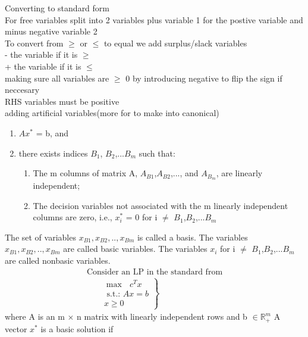 \documentclass{article}
\begin{document}
Converting to standard form\\
For free variables split into 2 variables plus variable 1 for the postive variable and minus negative variable 2\\
To convert from $\geq$ or $\leq$ to equal we add surplus/slack variables\\
- the variable if it is $\geq$\\
+ the variable if it is $\leq$\\
making sure all variables are $\geq$ 0 by introducing negative to flip the sign if neccesary\\
RHS variables must be positive\\
adding artificial variables(more for to make into canonical)\\

\begin{enumerate}
  \item $A x^*$ = b, and
  \item there exists indices $B_1$, $B_2$,...$B_m$ such that:
  \begin{enumerate}
    \item  The m columns of matrix A, $A_{B1}$,$A_{B2}$,..., and $A_{B_m}$, are linearly independent;
    \item  The decision variables not associated with the m linearly independent columns are zero, i.e., $x_i^*$ = 0 for i $\neq$ $B_1$,$B_2$,...$B_m$
  \end {enumerate}
\end{enumerate}
The set of variables {$x_{B1},x_{B2},..,x_{Bm}$} is called a
basis. The variables $x_{B1},x_{B2},..,x_{Bm}$ are called basic variables. The variables $x_i$ for i $\neq$ $B_1$,$B_2$,...$B_m$ are called nonbasic variables.
$$
\begin{array} { l } { \text { Consider an LP in the standard from } } \\ {\left. \qquad \begin{array} { c } { \max  } { \text{ }} c ^ { T }{ x } \\ { \text { s.t.: } A x = b } \\ { x \geq 0 } \end{array} \right\} } \end{array}
$$
where A is an m $\times$ n matrix with linearly independent rows and b  $\in \mathbb { R } ^ { m}_{+} $ A vector $x^*$ is a basic solution if
\end{document}
